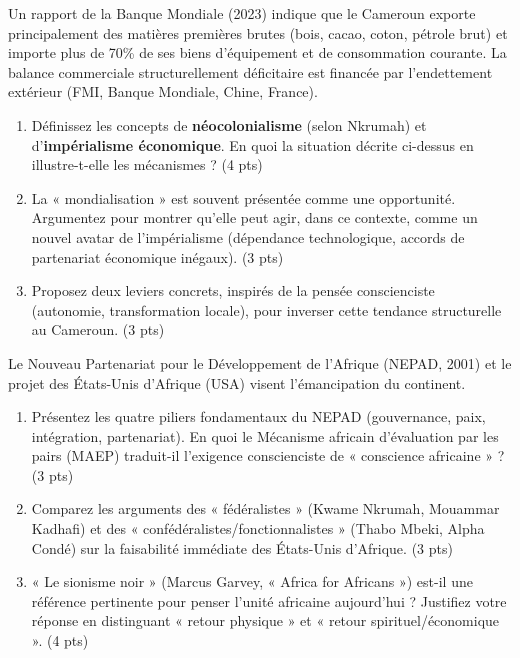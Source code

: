 \documentclass[11pt]{article}
\begin{document}
\begin{exercice}
Un rapport de la Banque Mondiale (2023) indique que le Cameroun exporte principalement des matières premières brutes (bois, cacao, coton, pétrole brut) et importe plus de 70\% de ses biens d'équipement et de consommation courante. La balance commerciale structurellement déficitaire est financée par l'endettement extérieur (FMI, Banque Mondiale, Chine, France).
\begin{enumerate}
    \item Définissez les concepts de \textbf{néocolonialisme} (selon Nkrumah) et d'\textbf{impérialisme économique}. En quoi la situation décrite ci-dessus en illustre-t-elle les mécanismes ? (4 pts)
    \item La « mondialisation » est souvent présentée comme une opportunité. Argumentez pour montrer qu'elle peut agir, dans ce contexte, comme un nouvel avatar de l'impérialisme (dépendance technologique, accords de partenariat économique inégaux). (3 pts)
    \item Proposez deux leviers concrets, inspirés de la pensée conscienciste (autonomie, transformation locale), pour inverser cette tendance structurelle au Cameroun. (3 pts)
\end{enumerate}
\end{exercice}

\begin{exercice}
Le Nouveau Partenariat pour le Développement de l'Afrique (NEPAD, 2001) et le projet des États-Unis d'Afrique (USA) visent l'émancipation du continent.
\begin{enumerate}
    \item Présentez les quatre piliers fondamentaux du NEPAD (gouvernance, paix, intégration, partenariat). En quoi le Mécanisme africain d'évaluation par les pairs (MAEP) traduit-il l'exigence conscienciste de « conscience africaine » ? (3 pts)
    \item Comparez les arguments des « fédéralistes » (Kwame Nkrumah, Mouammar Kadhafi) et des « confédéralistes/fonctionnalistes » (Thabo Mbeki, Alpha Condé) sur la faisabilité immédiate des États-Unis d'Afrique. (3 pts)
    \item « Le sionisme noir » (Marcus Garvey, « Africa for Africans ») est-il une référence pertinente pour penser l'unité africaine aujourd'hui ? Justifiez votre réponse en distinguant « retour physique » et « retour spirituel/économique ». (4 pts)
\end{enumerate}
\end{exercice}
\end{document}
